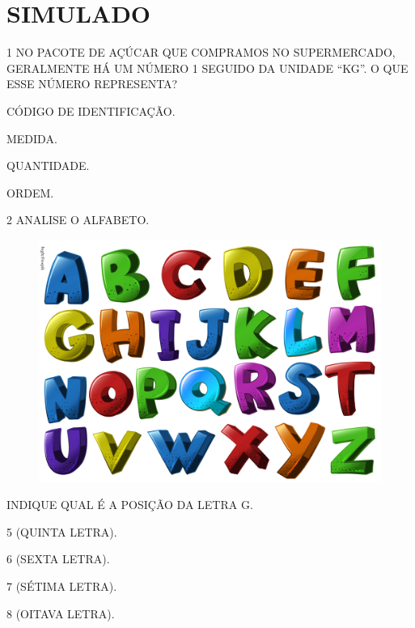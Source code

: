 \setcounter{chapter}{0}
\chapter[SIMULADO 1]{SIMULADO}

\num{1} NO PACOTE DE AÇÚCAR QUE COMPRAMOS NO SUPERMERCADO, GERALMENTE HÁ UM NÚMERO
1 SEGUIDO DA UNIDADE ``KG''. O QUE ESSE NÚMERO REPRESENTA?

\begin{escolha}
\item CÓDIGO DE IDENTIFICAÇÃO.

\item MEDIDA.

\item QUANTIDADE.

\item ORDEM.
\end{escolha}

\num{2} ANALISE O ALFABETO.


\begin{figure}[H]
\centering
\includegraphics[width=.8\textwidth]{./media/SAEB_1ANO_MAT_FIGURA112.png}
\end{figure}

INDIQUE QUAL É A POSIÇÃO DA LETRA G.

\begin{escolha}
\item 5 (QUINTA LETRA).

\item 6 (SEXTA LETRA).

\item 7 (SÉTIMA LETRA).

\item 8 (OITAVA LETRA).
\end{escolha}


